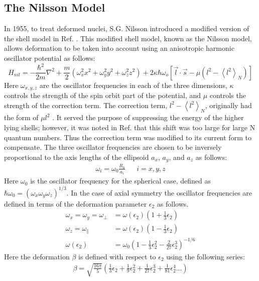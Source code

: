 \subsection{The Nilsson Model}
In 1955, to treat deformed nuclei, S.G. Nilsson introduced a modified version of the shell model in Ref. \cite{nilsson}. This modified shell model, known as the Nilsson model, allows deformation to be taken into account using an anisotropic harmonic oscillator potential as follows:
\begin{equation}
\label{eqn:chp2-nilsson-hamil}
H_{nil}=-\frac{\hbar^{2}}{2m}\nabla^{2} + \frac{m}{2}\left(\omega_{x}^{2}x^{2} + \omega_{y}^{2}y^{2} + \omega_{z}^{2}z^{2}\right) + 2\kappa \hbar \omega_{o}\left[\vec{l}\cdot \vec{s} - \mu \left(l^{2} - \left \langle l^{2} \right \rangle_{N} \right) \right]
\end{equation} 
Here $\omega_{x,y,z}$ are the oscillator frequencies in each of the three dimensions, $\kappa$ controls the strength of the spin orbit part of the potential, and $\mu$ controls the strength of the correction term. The correction term, $l^2 - \left \langle l^{2} \right \rangle_{N}$, originally had the form of $\mu l^2$ \cite{nilsson}. It served the purpose of suppressing the energy of the higher lying shells; however, it was noted in Ref. \cite{nilssonCorrection} that this shift was too large for large N quantum numbers. Thus the correction term was modified to its current form to compensate. The three oscillator frequencies are chosen to be inversely proportional to the axis lengths of the ellipsoid $a_x$, $a_y$, and $a_z$ as follows:
\begin{align}
\label{eqn:chp2-nilsson-oscilator-freq}
\omega_i = \omega_0\frac{R_0}{a_i} &  & i=x,y,z
\end{align}
Here $\omega_0$ is the oscillator frequency for the spherical case, defined as $\hbar\omega_0 = (\omega_x \omega_y \omega_z )^{1/3}$. In the case of axial symmetry the oscillator frequencies are defined in terms of the deformation parameter $\epsilon_2$ as follows.
\begin{align}
\label{eqn:chp2-nilsson-oscilator-freq-components}
\omega_{x}=\omega_{y}=\omega_{\bot}&=\omega(\epsilon_2)\left(1+\frac{1}{3}\epsilon_2 \right)\\
\omega_{z}=\omega_{\parallel}&=\omega(\epsilon_2)\left(1-\frac{1}{3}\epsilon_2 \right)\\
\omega(\epsilon_2) &= \omega_0\left(1-\frac{1}{3}\epsilon_2^2-\frac{2}{27}\epsilon_2^3\right)^{-1/6}
\end{align}
Here the deformation $\beta$ is defined with respect to $\epsilon_2$ using the following series:
\begin{align}
\label{eqn:chp2-nilsson-beta-from-epsilon}
\beta = \sqrt{\frac{16 \pi}{5}}\left( \frac{1}{3}\epsilon_2 + \frac{1}{9}\epsilon_2^2 + \frac{1}{27}\epsilon_2^3 +  \frac{1}{81}\epsilon_2^4...\right)
\end{align}

